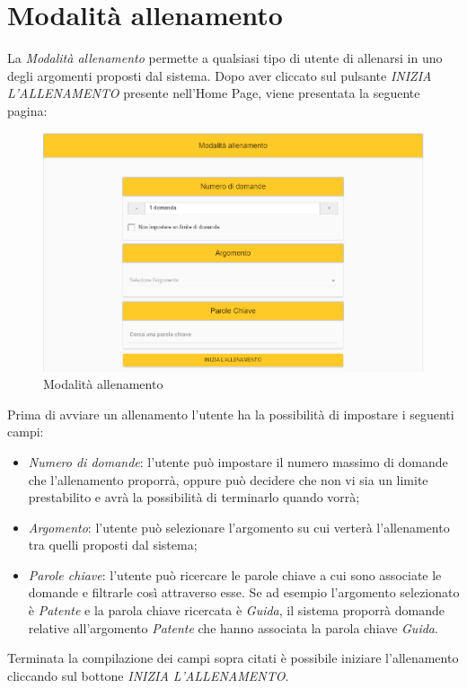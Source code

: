 \newpage
\section{Modalità allenamento}
La \textit{Modalità allenamento} permette a qualsiasi tipo di utente di allenarsi in uno degli argomenti proposti dal sistema. Dopo aver cliccato sul pulsante \textit{INIZIA L'ALLENAMENTO} presente nell'Home Page, viene presentata la seguente pagina:

\label{Modalità allenamento}
\begin{figure}[ht]
	\centering
	\includegraphics[scale=0.45]{img/allenamento.png}
	\caption{Modalità allenamento}
\end{figure}
\FloatBarrier

Prima di avviare un allenamento l'utente ha la possibilità di impostare i seguenti campi:
\begin{itemize}
	\item \textit{Numero di domande}: l'utente può impostare il numero massimo di domande che l'allenamento proporrà, oppure può decidere che non vi sia un limite prestabilito e avrà la possibilità di terminarlo quando vorrà;
	\item \textit{Argomento}: l'utente può selezionare l'argomento su cui verterà l'allenamento tra quelli proposti dal sistema;
	\item \textit{Parole chiave}: l'utente può ricercare le parole chiave a cui sono associate le domande e filtrarle così attraverso esse. Se ad esempio l'argomento selezionato è \textit{Patente} e la parola chiave ricercata è \textit{Guida}, il sistema proporrà domande relative all'argomento \textit{Patente} che hanno associata la parola chiave \textit{Guida}.
\end{itemize}

Terminata la compilazione dei campi sopra citati è possibile iniziare l'allenamento cliccando sul bottone \textit{INIZIA L'ALLENAMENTO}.
